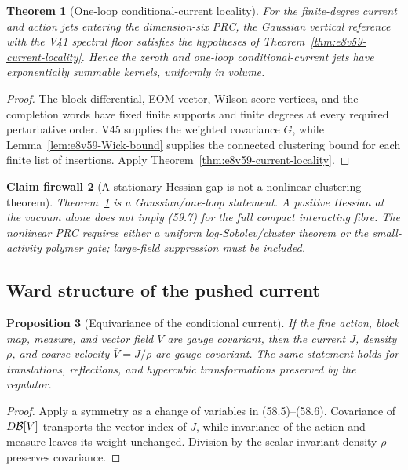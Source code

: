 \documentclass[11pt,oneside]{book}
\newtheorem{theorem}{Theorem}[chapter]
\newtheorem{proposition}[theorem]{Proposition}
\newtheorem{firewall}[theorem]{Claim firewall}
\theoremstyle{definition}
\theoremstyle{remark}
\begin{document}
\begin{theorem}[One-loop conditional-current locality]
\label{thm:e8v59-one-loop-current}
For the finite-degree current and action jets entering the
dimension-six PRC, the Gaussian vertical reference with the V41
spectral floor satisfies the hypotheses of
Theorem~\ref{thm:e8v59-current-locality}.  Hence the zeroth and
one-loop conditional-current jets have exponentially summable
kernels, uniformly in volume.
\end{theorem}

\begin{proof}
The block differential, EOM vector, Wilson score vertices, and
the completion words have fixed finite supports and finite degrees
at every required perturbative order.  V45 supplies the weighted
covariance \(G\), while Lemma~\ref{lem:e8v59-Wick-bound} supplies
the connected clustering bound for each finite list of
insertions.  Apply Theorem~\ref{thm:e8v59-current-locality}.
\end{proof}

\begin{firewall}[A stationary Hessian gap is not a nonlinear
clustering theorem]
\label{fire:e8v59-gap-not-clustering}
Theorem~\ref{thm:e8v59-one-loop-current} is a Gaussian/one-loop
statement.  A positive Hessian at the vacuum alone does not imply
(59.7) for the full compact interacting fibre.  The nonlinear PRC
requires either a uniform log-Sobolev/cluster theorem or the
small-activity polymer gate; large-field suppression must be
included.
\end{firewall}

\subsection{Ward structure of the pushed current}

\begin{proposition}[Equivariance of the conditional current]
\label{prop:e8v59-current-equivariance}
If the fine action, block map, measure, and vector field \(V\) are
gauge covariant, then the current \(J\), density \(\rho\), and
coarse velocity \(\overline V=J/\rho\) are gauge covariant.
The same statement holds for translations, reflections, and
hypercubic transformations preserved by the regulator.
\end{proposition}

\begin{proof}
Apply a symmetry as a change of variables in (58.5)--(58.6).
Covariance of \(D{\cal B}[V]\) transports the vector index of
\(J\), while invariance of the action and measure leaves its
weight unchanged.  Division by the scalar invariant density
\(\rho\) preserves covariance.
\end{proof}
\end{document}
